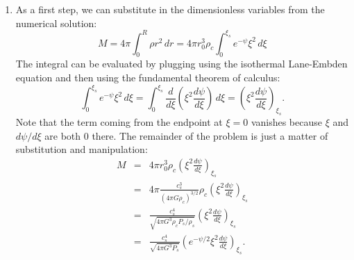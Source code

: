 \begin{enumerate}
\begin{enumerate}
\begin{verbatim}
# definition of the derivatives
def derivs(y, x):
    return( [y[1], -2*y[1]/x+exp(-y[0])] )

# starting points
x0 = 1e-4
y0 = [x0**2/6, x0/3]

# solve the ode
x = np.linspace(x0, 8, 200)
ysol = odeint(derivs, y0, x)

# plot psi and exp(-psi) vs. x
plt.plot(x, ysol[:,0], lw=2, label=r'$\psi$')
plt.plot(x, np.exp(-ysol[:,0]), lw=2,
         label=r'$\rho/\rho_c$')
plt.legend(loc='upper left')
plt.xlabel(r'$\xi$')
\end{verbatim}
\begin{marginfigure}
\texttt{[image: hw2sol1]}
\caption[Solution to problem set~\thesolutionset, problem~\theenumi\theenumii]{
\label{fig:hw2sol1}
Dimensionless potential $\psi$ and density $\rho/\rho_c = e^{-\psi}$ found by solving the isothermal Lane-Emden equation.
}
\end{marginfigure}
The output produced by this code is shown in Figure \ref{fig:hw2sol1}.

\item As a first step, we can substitute in the dimensionless variables from the numerical solution:
\begin{displaymath}
M = 4\pi \int_0^R \rho r^2 \, dr = 4\pi r_0^3 \rho_c \int_0^{\xi_s} e^{-\psi} \xi^2 \, d\xi
\end{displaymath}
The integral can be evaluated by plugging using the isothermal Lane-Embden equation and then using the fundamental theorem of calculus:
\begin{displaymath}
\int_0^{\xi_s} e^{-\psi} \xi^2 \, d\xi = \int_0^{\xi_s} \frac{d}{d\xi}\left(\xi^2 \frac{d\psi}{d\xi}\right) \, d\xi
= \left(\xi^2 \frac{d\psi}{d\xi}\right)_{\xi_s}.
\end{displaymath}
Note that the term coming from the endpoint at $\xi=0$ vanishes because $\xi$ and $d\psi/d\xi$ are both $0$ there. The remainder of the problem is just a matter of substitution and manipulation:
\begin{eqnarray*}
M & = & 4\pi r_0^3 \rho_c \left(\xi^2 \frac{d\psi}{d\xi}\right)_{\xi_s} \\
& = & 4\pi \frac{c_s^3}{(4\pi G\rho_c)^{3/2}} \rho_c \left(\xi^2 \frac{d\psi}{d\xi}\right)_{\xi_s} \\
& = & \frac{c_s^4}{\sqrt{4\pi G^3 \rho_c P_s/\rho_s}} \left(\xi^2 \frac{d\psi}{d\xi}\right)_{\xi_s} \\
& = & \frac{c_s^4}{\sqrt{4\pi G^3 P_s}}  \left(e^{-\psi/2}\xi^2 \frac{d\psi}{d\xi}\right)_{\xi_s}.
\end{eqnarray*}


\end{enumerate}
\end{enumerate}

